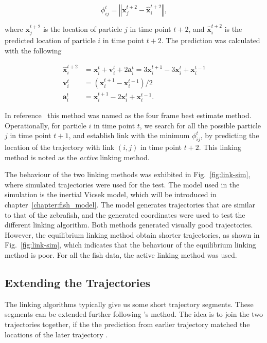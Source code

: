 \documentclass[11pt,twoside]{report}
\begin{document}
$$
\phi_{ij}^{t} = \left\Vert
\mathbf{x}_j^{t+2} - \hat{\mathbf{x}}_i^{t+2}
\right\Vert,
$$

\noindent where $\mathbf{x}_j^{t+2}$ is the location of particle $j$ in time point $t + 2$, and $\hat{\mathbf{x}}_i^{t+2}$ is the predicted location of particle $i$ in time point $t + 2$. The prediction was calculated with the following

$$
\begin{aligned}
\hat{\mathbf{x}}_i^{t + 2} &= 
\mathbf{x}_i^t + 
\mathbf{v}_i^t + 
2 \mathbf{a}_i^t = 
3 \mathbf{x}_i^{t+1} - 
3 \mathbf{x}_i^t +
\mathbf{x}_i^{t-1} \\
\mathbf{v}_i^t &= (\mathbf{x}_i^{t+1} - \mathbf{x}_i^{t - 1}) / 2 \\
\mathbf{a}_i^t &= 
\mathbf{x}_i^{t+1} - 2 \mathbf{x}_i^{t} + \mathbf{x}_i^{t-1}.
\end{aligned}
$$

\noindent In reference~\cite{ouellette2005ef} this method was named as the four frame best estimate method. Operationally, for particle $i$ in time point $t$, we search for all the possible particle $j$ in time point $t+1$, and establish link with the minimum $\phi_{ij}^t$, by predicting the location of the trajectory with link $(i, j)$ in time point $t + 2$. This linking method is noted as the \emph{active} linking method.

The behaviour of the two linking methods was exhibited in Fig.~\ref{fig:link-sim}, where simulated trajectories were used for the test. The model used in the simulation is the inertial Vicsek model, which will be introduced in chapter~\ref{chapter:fish_model}. The model generates trajectories that are similar to that of the zebrafish, and the generated coordinates were used to test the different linking algorithm.
Both methods generated visually good trajectories.
However, the equilibrium linking method obtain shorter trajectories, as shown in Fig.~\ref{fig:link-sim}, which indicates that the behaviour of the equilibrium linking method is poor. For all the fish data, the active linking method was used.



\subsection{Extending the Trajectories}

The linking algorithms typically give us some short trajectory segments. These segments can be extended further following \citeauthor{xu2008}'s method. The idea is to join the two trajectories together, if the the prediction from earlier trajectory matched the locations of the later trajectory \cite{xu2008}.
\end{document}

